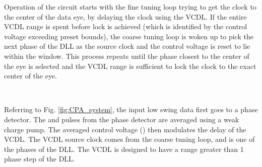 \documentclass[journal,twoside,letterpaper]{IEEEtran}
\begin{document}
Operation of the circuit starts
with the fine tuning loop trying to get the clock
to the center of the data eye, by delaying the clock using the
VCDL.
If the entire VCDL range is spent before lock is achieved (which
is identified by the control voltage exceeding preset bounds),
the coarse tuning loop is woken up
to pick the next phase of the DLL as the source clock
and the control voltage is reset to lie within the window.
This process repeats until the phase closest to the center
of the eye is selected and the VCDL range is sufficient
to lock the clock to the exact center of the eye.
\begin{figure*}
\centering
{}
\\
\centering
{}
\caption{(a) Block diagram clock synchronizer system, divided
into fine tuning and coarse tuning loops.
\mbox{VCDL - voltage controlled delay line},
\mbox{ - control voltage}, and (b) Schematic of the UP DOWN ring counter used in the synchronizer.}
\label{fig:CPA_system}
\end{figure*}
Referring to Fig. \ref{fig:CPA_system},
the input low swing data first goes to a phase detector.
The  and  pulses from the phase detector
are averaged using a weak charge pump.
The averaged control voltage ()
then modulates the delay of the VCDL.
The VCDL source clock comes from the coarse tuning loop, 
and is one of the phases of the DLL.
The VCDL is designed to have a range greater than 1 phase step of the DLL.
 
\end{document}
